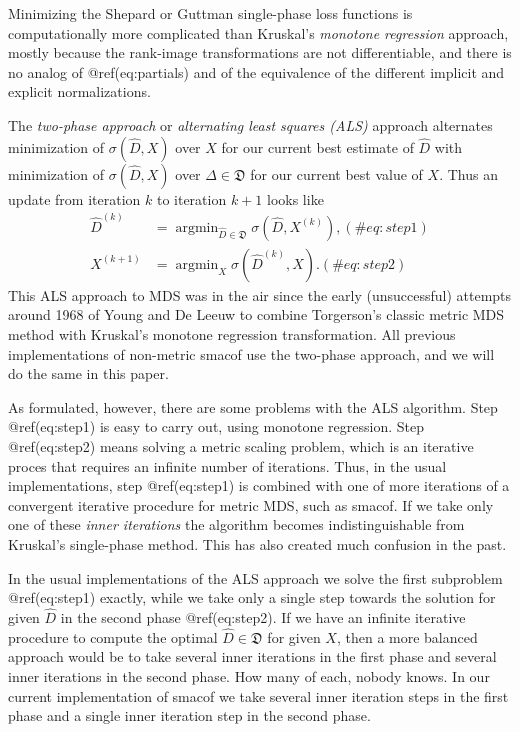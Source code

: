 \documentclass[
  12pt,
  letterpaper,
  DIV=11,
  numbers=noendperiod]{scrartcl}
\theoremstyle{plain}
\theoremstyle{remark}
\begin{document}
Minimizing the Shepard or Guttman single-phase loss functions is
computationally more complicated than Kruskal's \emph{monotone
regression} approach, mostly because the rank-image transformations are
not differentiable, and there is no analog of @ref(eq:partials) and of
the equivalence of the different implicit and explicit normalizations.

The \emph{two-phase approach} or \emph{alternating least squares (ALS)}
approach alternates minimization of \(\sigma(\hat D,X)\) over \(X\) for
our current best estimate of \(\hat D\) with minimization of
\(\sigma(\hat D,X)\) over \(\Delta\in\mathfrak{D}\) for our current best
value of \(X\). Thus an update from iteration \(k\) to iteration \(k+1\)
looks like \begin{subequations}
\begin{align}
\hat D^{(k)}&=\mathop{\text{argmin}}_{\hat D\in\mathfrak{D}}\sigma(\hat D,X^{(k)}),(\#eq:step1)\\
X^{(k+1)}&=\mathop{\text{argmin}}_X\sigma(\hat D^{(k)},X).(\#eq:step2)
\end{align} 
\end{subequations} This ALS approach to MDS was in the air since the
early (unsuccessful) attempts around 1968 of Young and De Leeuw to
combine Torgerson's classic metric MDS method with Kruskal's monotone
regression transformation. All previous implementations of non-metric
smacof use the two-phase approach, and we will do the same in this
paper.

As formulated, however, there are some problems with the ALS algorithm.
Step @ref(eq:step1) is easy to carry out, using monotone regression.
Step @ref(eq:step2) means solving a metric scaling problem, which is an
iterative proces that requires an infinite number of iterations. Thus,
in the usual implementations, step @ref(eq:step1) is combined with one
of more iterations of a convergent iterative procedure for metric MDS,
such as smacof. If we take only one of these \emph{inner iterations} the
algorithm becomes indistinguishable from Kruskal's single-phase method.
This has also created much confusion in the past.

In the usual implementations of the ALS approach we solve the first
subproblem @ref(eq:step1) exactly, while we take only a single step
towards the solution for given \(\hat D\) in the second phase
@ref(eq:step2). If we have an infinite iterative procedure to compute
the optimal \(\hat D\in\mathfrak{D}\) for given \(X\), then a more
balanced approach would be to take several inner iterations in the first
phase and several inner iterations in the second phase. How many of
each, nobody knows. In our current implementation of smacof we take
several inner iteration steps in the first phase and a single inner
iteration step in the second phase.
\end{document}
